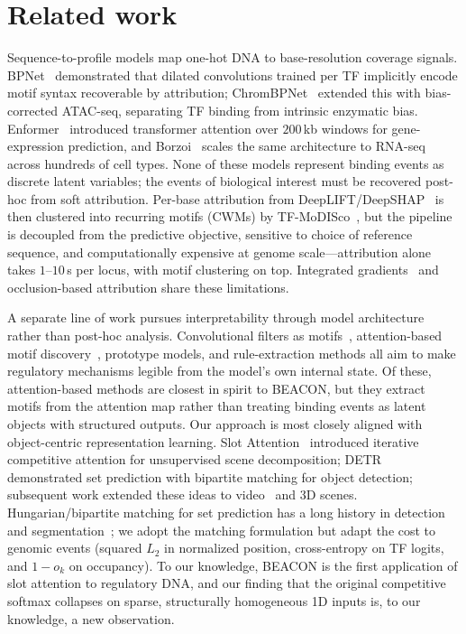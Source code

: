 \documentclass{article}
\begin{document}
\section{Related work}
Sequence-to-profile models map one-hot DNA to base-resolution coverage signals. BPNet~\citep{avsec2021bpnet} demonstrated that dilated convolutions trained per TF implicitly encode motif syntax recoverable by attribution; ChromBPNet~\citep{pampari2024chrombpnet} extended this with bias-corrected ATAC-seq, separating TF binding from intrinsic enzymatic bias. Enformer~\citep{avsec2021enformer} introduced transformer attention over $200$\,kb windows for gene-expression prediction, and Borzoi~\citep{linder2025borzoi} scales the same architecture to RNA-seq across hundreds of cell types. None of these models represent binding events as discrete latent variables; the events of biological interest must be recovered post-hoc from soft attribution. Per-base attribution from DeepLIFT/DeepSHAP~\citep{shrikumar2017deeplift,lundberg2017unified} is then clustered into recurring motifs (CWMs) by TF-MoDISco~\citep{shrikumar2018modisco}, but the pipeline is decoupled from the predictive objective, sensitive to choice of reference sequence, and computationally expensive at genome scale---attribution alone takes $1$--$10$\,s per locus, with motif clustering on top. Integrated gradients~\citep{sundararajan2017integrated} and occlusion-based attribution share these limitations.

A separate line of work pursues interpretability through model architecture rather than post-hoc analysis. Convolutional filters as motifs~\citep{kelley2016basset}, attention-based motif discovery~\citep{ullah2020selfattention}, prototype models, and rule-extraction methods all aim to make regulatory mechanisms legible from the model's own internal state. Of these, attention-based methods are closest in spirit to BEACON, but they extract motifs from the attention map rather than treating binding events as latent objects with structured outputs. Our approach is most closely aligned with object-centric representation learning. Slot Attention~\citep{locatello2020slotattention} introduced iterative competitive attention for unsupervised scene decomposition; DETR~\citep{carion2020detr} demonstrated set prediction with bipartite matching for object detection; subsequent work extended these ideas to video~\citep{kipf2022savi} and 3D scenes. Hungarian/bipartite matching for set prediction has a long history in detection and segmentation~\citep{stewart2016endtoend,carion2020detr}; we adopt the matching formulation but adapt the cost to genomic events (squared $L_2$ in normalized position, cross-entropy on TF logits, and $1-o_k$ on occupancy). To our knowledge, BEACON is the first application of slot attention to regulatory DNA, and our finding that the original competitive softmax collapses on sparse, structurally homogeneous 1D inputs is, to our knowledge, a new observation.
\end{document}
